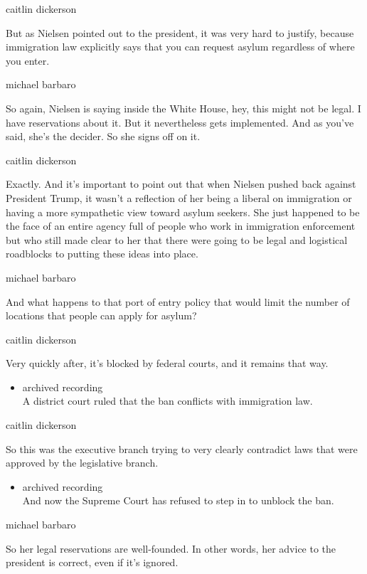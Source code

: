 caitlin dickerson

But as Nielsen pointed out to the president, it was very hard to
justify, because immigration law explicitly says that you can request
asylum regardless of where you enter.

michael barbaro

So again, Nielsen is saying inside the White House, hey, this might not
be legal. I have reservations about it. But it nevertheless gets
implemented. And as you've said, she's the decider. So she signs off on
it.

caitlin dickerson

Exactly. And it's important to point out that when Nielsen pushed back
against President Trump, it wasn't a reflection of her being a liberal
on immigration or having a more sympathetic view toward asylum seekers.
She just happened to be the face of an entire agency full of people who
work in immigration enforcement but who still made clear to her that
there were going to be legal and logistical roadblocks to putting these
ideas into place.

michael barbaro

And what happens to that port of entry policy that would limit the
number of locations that people can apply for asylum?

caitlin dickerson

Very quickly after, it's blocked by federal courts, and it remains that
way.

\begin{itemize}
\tightlist
\item
  archived recording\\
  A district court ruled that the ban conflicts with immigration law.
\end{itemize}

caitlin dickerson

So this was the executive branch trying to very clearly contradict laws
that were approved by the legislative branch.

\begin{itemize}
\tightlist
\item
  archived recording\\
  And now the Supreme Court has refused to step in to unblock the ban.
\end{itemize}

michael barbaro

So her legal reservations are well-founded. In other words, her advice
to the president is correct, even if it's ignored.

